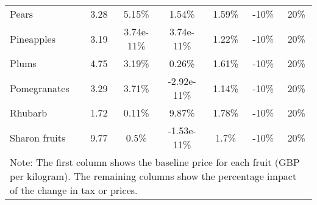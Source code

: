 \documentclass[11pt]{article}
\begin{document}
\begin{table}[h]
\begin{center}
{\begin{tabular}{lcccccc}
Pears &3.28 &5.15\% &1.54\% &1.59\% &-10\% &20\% \\
Pineapples &3.19 &3.74e-11\% &3.74e-11\% &1.22\% &-10\% &20\% \\
Plums &4.75 &3.19\% &0.26\% &1.61\% &-10\% &20\% \\
Pomegranates &3.29 &3.71\% &-2.92e-11\% &1.14\% &-10\% &20\% \\
\hline
Rhubarb &1.72 &0.11\% &9.87\% &1.78\% &-10\% &20\% \\
Sharon fruits &9.77 &0.5\% &-1.53e-11\% &1.7\% &-10\% &20\% \\
 \hline \hline
\multicolumn{7}{p{1.0 \textwidth}}{Note: The first column shows the baseline price for each fruit (GBP per kilogram). The remaining columns show the percentage impact of the change in tax or prices.}
\end{tabular}}
\end{center}
\end{table}
\end{document}
